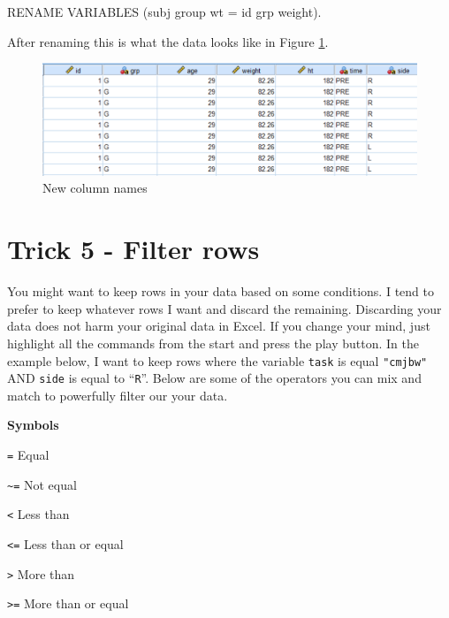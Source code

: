 \documentclass[
]{book}
\newenvironment{Shaded}{\begin{snugshade}}{\end{snugshade}}
\newcommand{\AttributeTok}[1]{\textcolor[rgb]{0.77,0.63,0.00}{#1}}
\newcommand{\FunctionTok}[1]{\textcolor[rgb]{0.00,0.00,0.00}{#1}}
\newcommand{\NormalTok}[1]{#1}
\begin{document}
\begin{Shaded}
\begin{Highlighting}[]
\NormalTok{RENAME }\FunctionTok{VARIABLES}\NormalTok{ (subj group }\AttributeTok{wt  =}\NormalTok{ id grp weight).}
\end{Highlighting}
\end{Shaded}

After renaming this is what the data looks like in Figure \ref{fig:rename-col}.

\begin{figure}
\includegraphics[width=1\linewidth]{images/rename} \caption{New column names}\label{fig:rename-col}
\end{figure}

\hypertarget{trick-5---filter-rows}{%
\chapter*{Trick 5 - Filter rows}\label{trick-5---filter-rows}}

You might want to keep rows in your data based on some conditions. I tend to prefer to keep whatever rows I want and discard the remaining. Discarding your data does not harm your original data in Excel. If you change your mind, just highlight all the commands from the start and press the play button. In the example below, I want to keep rows where the variable \texttt{task} is equal \texttt{"cmjbw"} AND \texttt{side} is equal to ``\texttt{R}''. Below are some of the operators you can mix and match to powerfully filter our your data.

\textbf{Symbols}

\texttt{=} Equal

\texttt{\textasciitilde{}=} Not equal

\texttt{\textless{}} Less than

\texttt{\textless{}=} Less than or equal

\texttt{\textgreater{}} More than

\texttt{\textgreater{}=} More than or equal
\end{document}
